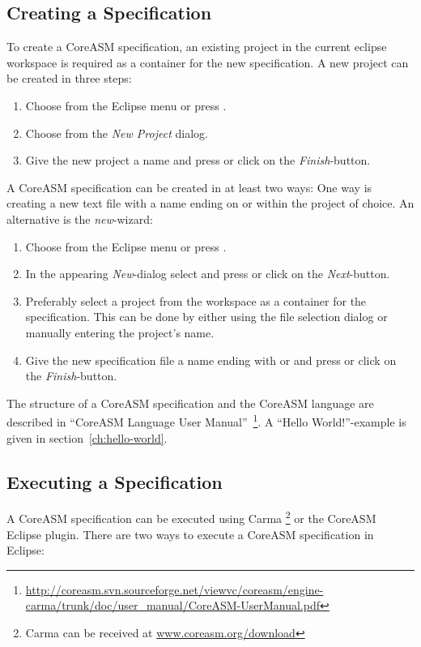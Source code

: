\documentclass[10pt,oneside,a4paper]{article}
\begin{document}
\subsection{Creating a Specification}
To create a CoreASM specification, an existing project in the current eclipse workspace is required as a container for the new specification. A new project can be created in three steps:
\begin{enumerate}
	\item Choose  from the Eclipse menu or press .
	\item Choose  from the \emph{New Project} dialog.
	\item Give the new project a name and press \keys{\enter} or click on the \emph{Finish}-button.
\end{enumerate}

A CoreASM specification can be created in at least two ways: One way is creating a new text file with a name ending on  or  within the project of choice. An alternative is the \emph{new}-wizard:
\begin{enumerate}
	\item Choose  from the Eclipse menu or press .
	\item In the appearing \emph{New}-dialog select  and press \keys{\enter} or click on the \emph{Next}-button.
	\item Preferably select a project from the workspace as a container for the specification. This can be done by either using the file selection dialog or manually entering the project's name.
	\item Give the new specification file a name ending with  or  and press \keys{\enter} or click on the \emph{Finish}-button.
\end{enumerate}

The structure of a CoreASM specification and the CoreASM language are described in ``CoreASM Language User Manual''~\cite[p.\,7]{Rarahbod2011}\footnote{\url{http://coreasm.svn.sourceforge.net/viewvc/coreasm/engine-carma/trunk/doc/user\_manual/CoreASM-UserManual.pdf}}. A ``Hello World!''-example is given in section~\ref{ch:hello-world}.

\subsection{Executing a Specification}
A CoreASM specification can be executed using Carma \cite[p.\,4]{Rarahbod2011}\footnote{Carma can be received at \url{www.coreasm.org/download}} or the CoreASM Eclipse plugin. There are two ways to execute a CoreASM specification in Eclipse:
\end{document}
